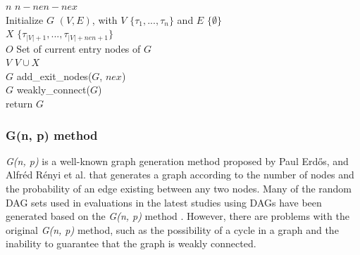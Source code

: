 \begin{algorithm}[t]
    {\footnotesize
        $n$ \la $n - nen - nex$ \\
        Initialize $G$ \la $(V, E)$, with $V$ \la $\{\tau_1, ..., \tau_{n}\}$ and $E$ \la $\{\emptyset\}$ \\
        $X$ \la $\{\tau_{|V|+1}, ..., \tau_{|V|+nen+1}\}$ \\
        $O$ \la Set of current entry nodes of $G$ \\
        $V$ \la $V \cup X$ \\
        $G$ \la add\_exit\_nodes($G$, $nex$) \\
        $G$ \la weakly\_connect($G$) \\
        return $G$
        \caption{{\it G(n, p)} method in MRDAG-Gen}
        \label{alg: g_n_p}
    }
\end{algorithm}


\subsubsection{G(n, p) method}
\label{sssec: g_n_p}

{\it G(n, p)} is a well-known graph generation method proposed by Paul Erd{\H{o}}s, and Alfr{\'e}d R{\'e}nyi et al. \cite{cordeiro2010random} that generates a graph according to the number of nodes and the probability of an edge existing between any two nodes.
Many of the random DAG sets used in evaluations in the latest studies using DAGs have been generated based on the {\it G(n, p)} method \cite{voronov2021ai, he2021response, guo2019energy, dong2019efficient}.
However, there are problems with the original {\it G(n, p)} method, such as the possibility of a cycle in a graph and the inability to guarantee that the graph is weakly connected.

